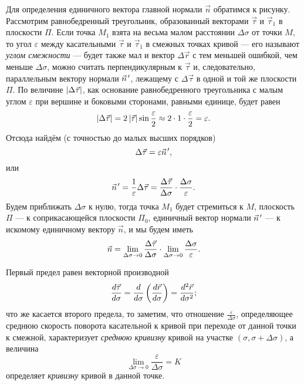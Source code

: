 Для определения единичного вектора главной нормали $\vec{n}$ обратимся к
рисунку. Рассмотрим равнобедренный треугольник, образованный векторами
$\vec{\tau}$ и $\vec{\tau}_1$ в плоскости $\Pi$. Если точка $M_1$ взята на
весьма малом расстоянии $\Delta \sigma$ от точки $M$, то угол $\varepsilon$
между касательными $\vec{\tau}$ и $\vec{\tau}_1$ в смежных точках кривой ---
его называют \textit{углом смежности} --- будет также мал и вектор
$\Delta \vec{r}$ с тем меньшей ошибкой, чем меньше $\Delta \sigma$, можно
считать перпендикулярным к $\vec{\tau}$ и, следовательно, параллельным вектору
нормали $\pvec{n}$, лежащему с $\Delta \vec{\tau}$ в одной и той же плоскости
$\Pi$. По величине $\abs{\Delta \vec{\tau}}$, как основание равнобедренного
треугольника с малым углом $\varepsilon$ при вершине и боковыми сторонами,
равными единице, будет равен
\begin{equation*}
  \abs{\Delta \vec{\tau}} = 2 \abs{\vec{\tau}} \sin \frac{\varepsilon}{2}
    \approx 2 \cdot 1 \cdot \frac{\varepsilon}{2} = \varepsilon.
\end{equation*}
Отсюда найдём (с точностью до малых высших порядков)
\begin{equation*}
  \Delta \vec{\tau} = \varepsilon \pvec{n},
\end{equation*}
или
\begin{equation*}
  \pvec{n} = \frac{1}{\varepsilon} \Delta \vec{\tau} =
    \deltader{\vec{\tau}}{\sigma} \cdot \frac{\Delta \sigma}{\varepsilon}.
\end{equation*}
Будем приближать $\Delta \sigma$ к нулю, тогда точка $M_1$ будет стремиться к
$M$, плоскость $\Pi$ --- к соприкасающейся плоскости $\Pi_0$, единичный вектор
нормали $\pvec{n}$ --- к искомому единичному вектору $\vec{n}$, и мы будем
иметь
\begin{equation*}
  \vec{n} = \lim_{\Delta \sigma \to 0} \deltader{\vec{\tau}}{\sigma} \cdot
    \lim_{\Delta \sigma \to 0} \frac{\Delta \sigma}{\varepsilon}.
\end{equation*}

Первый предел равен векторной производной
\begin{equation*}
  \der[\vec{\tau}]{\sigma} = \der{\sigma} \paren{\der[\vec{r}]{\sigma}} =
    \sder[\vec{r}]{\sigma};
\end{equation*}
что же касается второго предела, то заметим, что отношение
$\frac{\varepsilon}{\Delta \sigma}$, определяющее среднюю скорость поворота
касательной к кривой при переходе от данной точки к смежной, характеризует
\textit{среднюю кривизну} кривой на участке $(\sigma, \sigma + \Delta \sigma)$,
а величина
\begin{equation}
  \lim_{\Delta \sigma \to 0} \frac{\varepsilon}{\Delta \sigma} = K
\end{equation}
определяет \textit{кривизну} кривой в данной точке.

